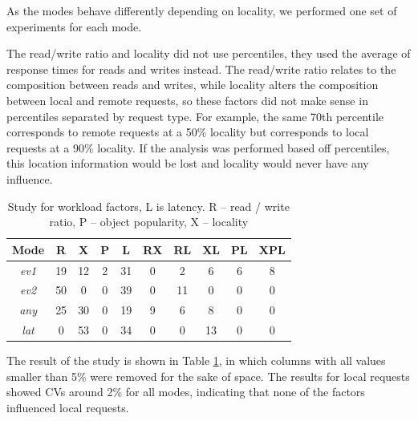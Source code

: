 \documentclass[man,floatsintext,12pt]{apa6}
\begin{document}
As the modes behave differently depending on locality, we performed one set of
experiments for each mode.

The read/write ratio and locality did not use percentiles, they used the
average of response times for reads and writes instead. The read/write ratio
relates to the composition between reads and writes, while locality alters the
composition between local and remote requests, so these factors did not make
sense in percentiles separated by request type. For example, the same 70th
percentile corresponds to remote requests at a 50\% locality but corresponds to
local requests at a 90\% locality. If the analysis was performed based off
percentiles, this location information would be lost and locality would never
have any influence.

\begin{table}[h!]
\caption{Study for workload factors, L is latency. R -- read / write ratio, P
-- object popularity, X -- locality}
\begin{tabular}{cccccccccc} \toprule

Mode & R & X & P & L & RX & RL & XL & PL & XPL\\ \midrule

\textit{ev1} & 19 & 12 & 2 & 31 & 0 & 2 & 6 & 6 & 8\\

\textit{ev2} & 50 & 0 & 0 & 39 & 0 & 11 & 0 & 0 & 0\\

\textit{any} & 25 & 30 & 0 & 19 & 9 & 6 & 8 & 0 & 0\\

\textit{lat} & 0 & 53 & 0 & 34 & 0 & 0 & 13 & 0 & 0\\ \bottomrule

\end{tabular}
\label{tab:estudo_para_fatores_de_carga_de_trabalho}
\end{table}

The result of the study is shown in Table
\ref{tab:estudo_para_fatores_de_carga_de_trabalho}, in which columns with all
values smaller than 5\% were removed for the sake of space. The results for
local requests showed CVs around 2\% for all modes, indicating that none of the
factors influenced local requests.
\end{document}
